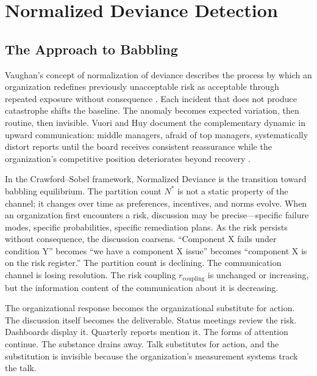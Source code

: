 \documentclass[11pt,a4paper]{article}
\begin{document}
\section{Normalized Deviance Detection}
\label{sec:normalized-deviance}

\subsection{The Approach to Babbling}
\label{sec:approach-babbling}

Vaughan's concept of normalization of deviance describes the process by which an organization redefines previously unacceptable risk as acceptable through repeated exposure without consequence \citep{vaughan1996}. Each incident that does not produce catastrophe shifts the baseline. The anomaly becomes expected variation, then routine, then invisible. Vuori and Huy document the complementary dynamic in upward communication: middle managers, afraid of top managers, systematically distort reports until the board receives consistent reassurance while the organization's competitive position deteriorates beyond recovery \citep{vuori2016}.

In the Crawford--Sobel framework, Normalized Deviance is the transition toward babbling equilibrium. The partition count $N^*$ is not a static property of the channel; it changes over time as preferences, incentives, and norms evolve. When an organization first encounters a risk, discussion may be precise---specific failure modes, specific probabilities, specific remediation plans. As the risk persists without consequence, the discussion coarsens. ``Component X fails under condition Y'' becomes ``we have a component X issue'' becomes ``component X is on the risk register.'' The partition count is declining. The communication channel is losing resolution. The risk coupling $r_{\text{coupling}}$ is unchanged or increasing, but the information content of the communication about it is decreasing.

The organizational response becomes the organizational substitute for action. The discussion itself becomes the deliverable. Status meetings review the risk. Dashboards display it. Quarterly reports mention it. The forms of attention continue. The substance drains away. Talk substitutes for action, and the substitution is invisible because the organization's measurement systems track the talk.
\end{document}

